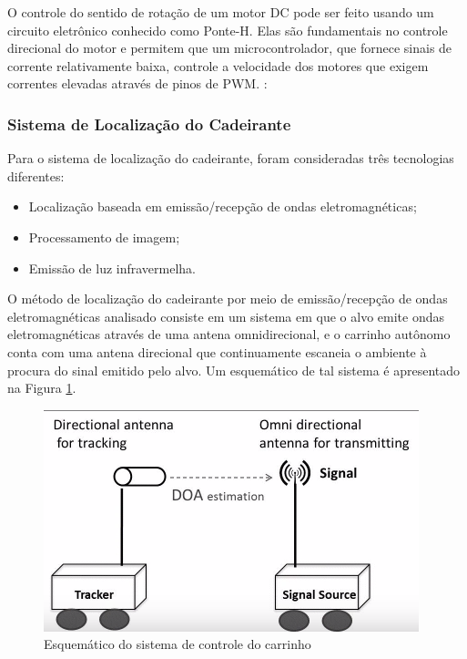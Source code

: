\par O controle do sentido de rotação de um motor DC pode ser feito usando um circuito eletrônico conhecido como Ponte-H. Elas são fundamentais no controle direcional do motor e permitem que um microcontrolador, que fornece sinais de corrente relativamente baixa, controle a velocidade dos motores que exigem correntes elevadas através de pinos de PWM. \cite{newtoncbraga}: 

\subsubsection{Sistema de Localização do Cadeirante}

\par Para o sistema de localização do cadeirante, foram consideradas três tecnologias diferentes:

\begin{itemize}  
\item Localização baseada em emissão/recepção de ondas eletromagnéticas;
\item Processamento de imagem;
\item Emissão de luz infravermelha.
\end{itemize}

\par O método de localização do cadeirante por meio de emissão/recepção de ondas eletromagnéticas analisado \cite{min2015active} consiste em um sistema em que o alvo emite ondas eletromagnéticas através de uma antena omnidirecional,  
e o carrinho autônomo conta com uma antena direcional que continuamente escaneia o ambiente à procura do sinal emitido pelo alvo. Um esquemático de tal sistema é apresentado na Figura \ref{fig:antenaElectroMagWave}. 

\newpage

\begin{figure}[ht]
		\centering
		\includegraphics[width=.5\textwidth]{figuras/antenaElectroMagWave.png}
		\caption{Esquemático do sistema de controle do carrinho}
		\label{fig:antenaElectroMagWave}
	\end{figure} 
    

